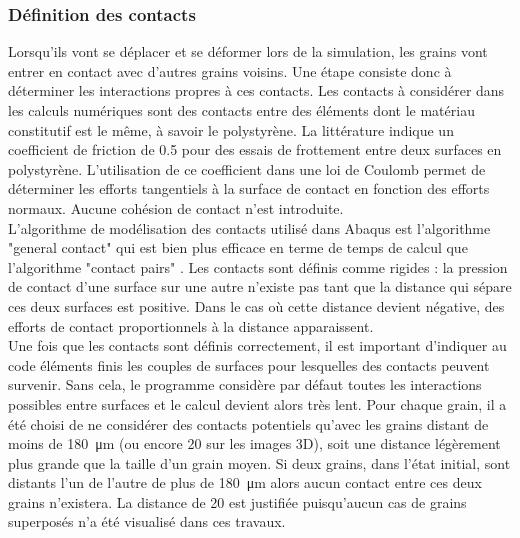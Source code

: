 		\subsubsection{Définition des contacts}
			Lorsqu'ils vont se déplacer et se déformer lors de la simulation, les grains vont entrer en contact avec d'autres grains voisins. Une étape consiste donc à déterminer les interactions propres à ces contacts. Les contacts à considérer dans les calculs numériques sont des contacts entre des éléments dont le matériau constitutif est le même, à savoir le polystyrène. La littérature \citep{engineeringtoolbox,matweb,wypych_handbook_2016} indique un coefficient de friction de \num{0.5} pour des essais de frottement entre deux surfaces en polystyrène. L'utilisation de ce coefficient dans une loi de Coulomb permet de déterminer les efforts tangentiels à la surface de contact en fonction des efforts normaux. Aucune cohésion de contact n'est introduite.
			\\L'algorithme de modélisation des  contacts utilisé dans Abaqus est l'algorithme "general contact" qui est bien plus efficace en terme de temps de calcul que l'algorithme "contact pairs" \citep{abaqus2016}. Les contacts sont définis comme rigides : la pression de contact d'une surface sur une autre n'existe pas tant que la distance qui sépare ces deux surfaces est positive. Dans le cas où cette distance devient négative, des efforts de contact proportionnels à la distance apparaissent.
			\\Une fois que les contacts sont définis correctement, il est important d'indiquer au code éléments finis les couples de surfaces pour lesquelles des contacts peuvent survenir. Sans cela, le programme considère par défaut toutes les interactions possibles entre surfaces et le calcul devient alors très lent. Pour chaque grain, il a été choisi de ne considérer des contacts potentiels qu'avec les grains distant de moins de \SI{180}{\micro\meter} (ou encore \SI{20}{\voxel} sur les images 3D), soit une distance légèrement plus grande que la taille d'un grain moyen. Si deux grains, dans l'état initial, sont distants l'un de l'autre de plus de \SI{180}{\micro\meter} alors aucun contact entre ces deux grains n'existera. La distance de \SI{20}{\voxel} est justifiée puisqu'aucun cas de grains superposés n'a été visualisé dans ces travaux.

